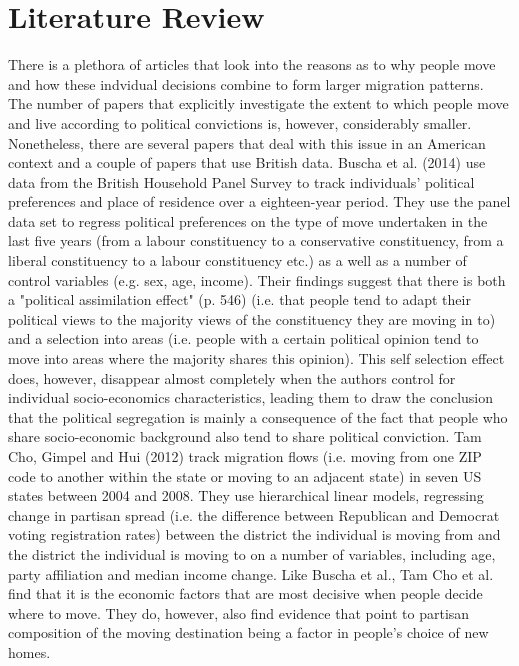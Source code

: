 \documentclass[12pt, a4paper]{article}
\begin{document}
\section{Literature Review}\label{lit}
There is a plethora of articles that look into the reasons as to why people move and how these indvidual decisions combine to form larger migration patterns. The number of papers that explicitly investigate the extent to which people move and live according to political convictions is, however, considerably smaller. Nonetheless, there are several papers that deal with this issue in an American context and a couple of papers that use British data. 
\newline Buscha et al. (2014) use data from the British Household Panel Survey to track individuals' political preferences and place of residence over a eighteen-year period. They use the panel data set to regress political preferences on the type of move undertaken in the last five years (from a labour constituency to a conservative constituency, from a liberal constituency to a labour constituency etc.) as a well as a number of control variables (e.g. sex, age, income). Their findings suggest that there is both a "political assimilation effect" (p. 546) (i.e. that people tend to adapt their political views to the majority views of the constituency they are moving in to) and a selection into areas (i.e. people with a certain political opinion tend to move into areas where the majority shares this opinion). This self selection effect does, however, disappear almost completely when the authors control for individual socio-economics characteristics, leading them to draw the conclusion that the political segregation is mainly a consequence of the fact that people who share socio-economic background also tend to share  political conviction.   
\newline Tam Cho, Gimpel and Hui (2012) track migration flows (i.e. moving from one ZIP code to another within the state or moving to an adjacent state) in seven US states between 2004 and 2008. They use hierarchical linear models, regressing change in partisan spread (i.e. the difference between Republican and Democrat voting registration rates) between the district the individual is moving from and the district the individual is moving to on a number of variables, including age, party affiliation and median income change. Like Buscha et al., Tam Cho et al. find that it is the economic factors that are most decisive when people decide where to move. They do, however, also find evidence that point to partisan composition of the moving destination being a factor in people's choice of new homes. 
\end{document}
